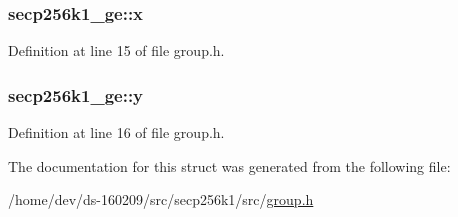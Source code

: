 \hypertarget{structsecp256k1__ge_a3c04a97b606c82ea87e55d4a06f06b6e}{}
\subsubsection[{x}]{ secp256k1\+\_\+ge\+::x}\label{structsecp256k1__ge_a3c04a97b606c82ea87e55d4a06f06b6e}


Definition at line 15 of file group.\+h.

\hypertarget{structsecp256k1__ge_a604295983a1f4aa6e8b5b0f1e46f9ee0}{}
\subsubsection[{y}]{ secp256k1\+\_\+ge\+::y}\label{structsecp256k1__ge_a604295983a1f4aa6e8b5b0f1e46f9ee0}


Definition at line 16 of file group.\+h.



The documentation for this struct was generated from the following file\+:\begin{DoxyCompactItemize}
\item 
/home/dev/ds-\/160209/src/secp256k1/src/\hyperlink{group_8h}{group.\+h}\end{DoxyCompactItemize}
